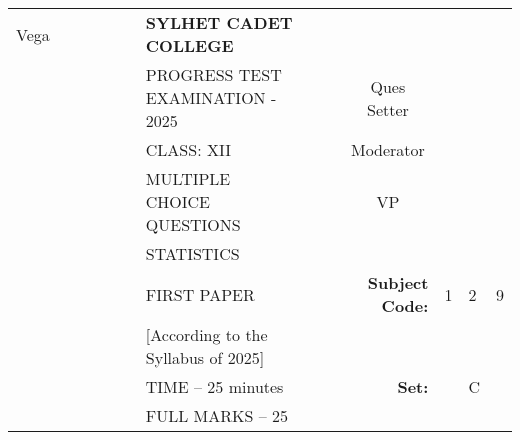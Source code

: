 \documentclass[12pt]{exam}
\begin{document}
\begin{table}[]
\begin{tabular}{lllllllllrlll}
Vega &  &  &  &  &  & \textbf{SYLHET CADET COLLEGE}       &  &                       & \multicolumn{1}{l}{}                        &                        &                        &                        \\ \cline{10-13} 
       &  &  &  &  &  & PROGRESS TEST EXAMINATION - 2025             &  & \multicolumn{1}{l|}{} & \multicolumn{1}{c|}{Ques Setter}            & \multicolumn{3}{l|}{}                                                    \\ \cline{10-13} 
       &  &  &  &  &  & CLASS: XII                          &  & \multicolumn{1}{l|}{} & \multicolumn{1}{c|}{Moderator}              & \multicolumn{3}{l|}{}                                                    \\ \cline{10-13} 
       &  &  &  &  &  & MULTIPLE CHOICE QUESTIONS           &  & \multicolumn{1}{l|}{} & \multicolumn{1}{c|}{VP}                     & \multicolumn{3}{l|}{}                                                    \\ \cline{10-13} 
       &  &  &  &  &  & STATISTICS                          &  &                       &                                             &                        &                        &                        \\ \cline{11-13} 
       &  &  &  &  &  & FIRST PAPER                        &  &                       & \multicolumn{1}{r|}{\textbf{Subject Code:}} & \multicolumn{1}{l|}{1} & \multicolumn{1}{l|}{2} & \multicolumn{1}{l|}{9} \\ \cline{11-13} 
       &  &  &  &  &  & [According to the Syllabus of 2025] &  &                       &                                             &                        &                        &                        \\ \cline{12-12}
       &  &  &  &  &  & TIME – 25 minutes                   &  &                       & \textbf{Set:}                               & \multicolumn{1}{l|}{}  & \multicolumn{1}{l|}{C} &                        \\ \cline{12-12}
       &  &  &  &  &  & FULL MARKS – 25                     &  &                       & \multicolumn{1}{l}{}                        &                        &                        &                       
\end{tabular}
\end{table}
\end{document}

